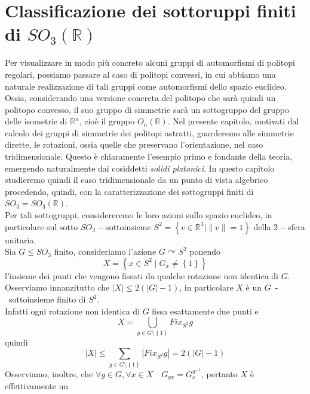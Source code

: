 \newcommand{\SOtre}{SO_3(\mathbb{R})}
\newcommand{\Rtre}{\mathbb{R}^3}

\section{Classificazione dei sottoruppi finiti di $\SOtre$}
Per visualizzare in modo pi\`u concreto alcuni gruppi di automorfismi di politopi regolari, possiamo passare al caso di politopi convessi,
in cui abbiamo una naturale realizzazione di tali gruppi come automorfismi dello spazio euclideo. Ossia, considerando una versione concreta
del politopo che sar\`a quindi un politopo convesso, il suo gruppo di simmetrie sar\`a un sottogruppo del gruppo delle isometrie di 
$\mathbb{R}^n$, cio\`e il gruppo $O_n(\mathbb{R})$. Nel presente capitolo, motivati dal calcolo dei gruppi di simmetrie dei politopi astratti,
guarderemo alle simmetrie dirette, le rotazioni, ossia quelle che preservano l'orientazione, nel caso tridimensionale. Questo \`e chiaramente
l'esempio primo e fondante della teoria, emergendo naturalmente dai cosiddetti \emph{solidi platonici}.
In questo capitolo studieremo quindi il caso tridimensionale da un punto di vista algebrico procedendo, quindi, con la caratterizzazione dei
sottogruppi finiti di $SO_3=\SOtre$.\\
Per tali sottogruppi, considereremo le loro azioni sullo spazio euclideo, in particolare sul sotto $SO_3-$sottoinsieme
$S^2=\left\{v\in\Rtre\mid\|v\|=1\right\}$ della $2-$sfera unitaria.\\
Sia $G\leq SO_3$ finito, consideriamo l'azione $G \curvearrowright S^2$ ponendo
\begin{equation*}
X=\left\{x\in S^2\mid G_x\neq\left\{1\right\}\right\}
\end{equation*}
l'insieme dei punti che vengono fissati da qualche rotazione non identica di $G$.\\
Osserviamo innanzitutto che $\left|X\right|\leq 2(\left|G\right|-1)$, in particolare $X$ \`e un $G$~-~sottoinsieme finito di $S^2$.\\
Infatti ogni rotazione non identica di $G$ fissa esattamente due punti e
\begin{equation*}
X=\bigcup_{g\in G\setminus\left\{1\right\}}Fix_{S^2}g
\end{equation*}
quindi
\begin{equation*}
\left|X\right|\leq\sum_{g\in G\setminus\left\{1\right\}}\left|Fix_{S^2}g\right|=2(\left|G\right|-1)
\end{equation*}
Osserviamo, inoltre, che $\forall g\in G, \forall x\in X\quad G_{gx}=G_x^{g^{-1}}$, pertanto $X$ \`e effettivamente un
